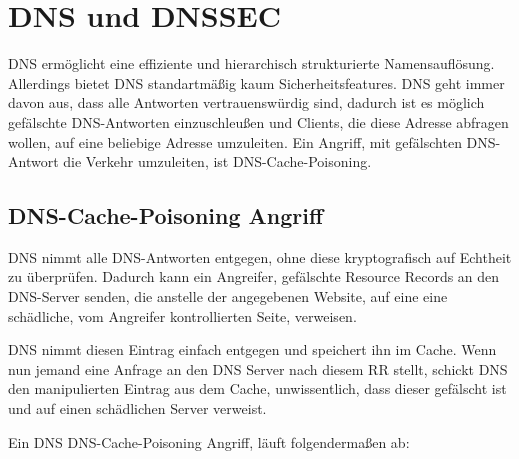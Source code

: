 \chapter{DNS und DNSSEC}
\label{section-DNSSEC}
DNS ermöglicht eine effiziente und hierarchisch strukturierte Namensauflösung.
Allerdings bietet DNS standartmäßig kaum Sicherheitsfeatures.
DNS geht immer davon aus, dass alle Antworten vertrauenswürdig sind, dadurch ist es möglich gefälschte DNS-Antworten einzuschleußen und Clients, die diese Adresse abfragen wollen, auf eine beliebige Adresse umzuleiten.
Ein Angriff, mit gefälschten DNS-Antwort die Verkehr umzuleiten, ist DNS-Cache-Poisoning.

\section{DNS-Cache-Poisoning Angriff}
DNS nimmt alle DNS-Antworten entgegen, ohne diese kryptografisch auf Echtheit zu überprüfen.
Dadurch kann ein Angreifer, gefälschte Resource Records an den DNS-Server senden, die anstelle der angegebenen Website, auf eine eine schädliche, vom Angreifer kontrollierten Seite, verweisen.

DNS nimmt diesen Eintrag einfach entgegen und speichert ihn im Cache.
Wenn nun jemand eine Anfrage an den DNS Server nach diesem RR stellt, schickt DNS den manipulierten Eintrag aus dem Cache, unwissentlich, dass dieser gefälscht ist und auf einen schädlichen Server verweist.

Ein DNS DNS-Cache-Poisoning Angriff, läuft folgendermaßen ab:

